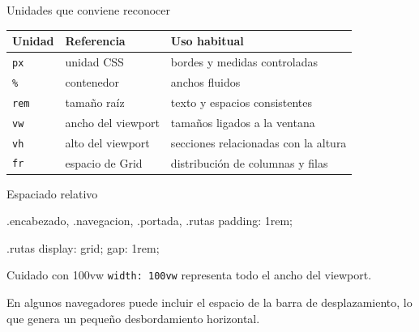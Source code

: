 \documentclass[aspectratio=169,11pt]{beamer}
\begin{document}
    \begin{frame}{Unidades que conviene reconocer}
        \begin{center}
            \small
            \begin{tabular}{p{2.2cm}p{3.8cm}p{7cm}}
                \toprule
                \textbf{Unidad} & \textbf{Referencia} & \textbf{Uso habitual} \\
                \midrule
                \texttt{px} & unidad CSS & bordes y medidas controladas \\
                \texttt{\%} & contenedor & anchos fluidos \\
                \texttt{rem} & tamaño raíz & texto y espacios consistentes \\
                \texttt{vw} & ancho del viewport & tamaños ligados a la ventana \\
                \texttt{vh} & alto del viewport & secciones relacionadas con la altura \\
                \texttt{fr} & espacio de Grid & distribución de columnas y filas \\
                \bottomrule
            \end{tabular}
        \end{center}
    \end{frame}

    \begin{frame}[fragile]{Espaciado relativo}
        \begin{csscodedark}
            .encabezado,
            .navegacion,
            .portada,
            .rutas {
                padding: 1rem;
            }

            .rutas {
                display: grid;
                gap: 1rem;
            }
        \end{csscodedark}

    \end{frame}

    \begin{frame}{Cuidado con 100vw}
        \texttt{width: 100vw} representa todo el ancho del viewport.

        En algunos navegadores puede incluir el espacio de la barra de desplazamiento,
        lo que genera un pequeño desbordamiento horizontal.

    \end{frame}
\end{document}
